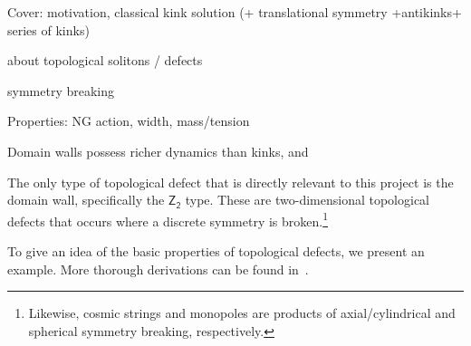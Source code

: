





\begin{bullets}
    \item Cover: motivation, classical kink solution (+ translational symmetry +antikinks+ series of kinks)
    \item about topological solitons / defects
    \item symmetry breaking
    \item Properties: NG action, width, mass/tension
\end{bullets}


 Domain walls possess richer dynamics than kinks, and \blahblah 




The only type of topological defect that is directly relevant to this project is the domain wall, specifically the $\mathsf{Z_2}$ type. These are two-dimensional topological defects that occurs where a discrete symmetry is broken.\footnote{%
Likewise, cosmic strings and monopoles are products of axial/cylindrical and spherical symmetry breaking, respectively.%
} %



To give an idea of the basic properties of topological defects, we present an example. More thorough derivations can be found in~\citet{vachaspatiKinksDomainWalls2006}. 

